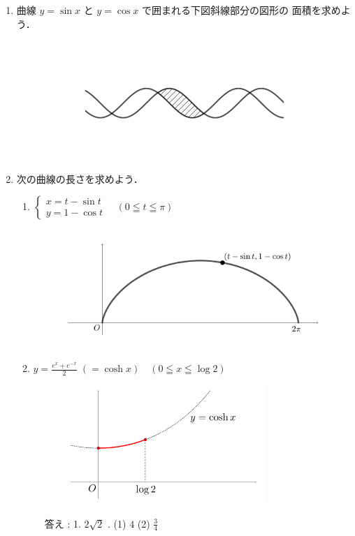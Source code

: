 \documentclass[10pt, uplatex, dvipdfmx]{jsarticle}
\theoremstyle{definition}
\numberwithin{equation}{section}
\newcommand{\ds}{\displaystyle}
\begin{document}
\begin{enumerate}

\item 曲線 $y=\sin x$ と $y=\cos x$ で囲まれる下図斜線部分の図形の
  面積を求めよう．
  \begin{figure}[h]
    \centering
    \includegraphics[height=4.5cm]{./pictures/05/sincos.pdf}
  \end{figure}
  
\item 次の曲線の長さを求めよう．
  \vspace{1zh}
  
  \begin{enumerate}[(1)]

    
  \item $\begin{cases}
      x=t-\sin t\\
      y=1-\cos t
    \end{cases}\quad (0 \leqq t \leqq \pi)$
    \begin{figure}[h]
      \centering
      \includegraphics[height=4.5cm]{./pictures/05/cycloid.pdf}
    \end{figure}
    
  \item $\ds y=\frac{e^{x}+e^{-x}}{2} \; \left(= \cosh x\right) \quad (0 \leqq x \leqq \log 2)$
    \begin{figure}[h]
      \centering
      \includegraphics[height=4.5cm]{./pictures/05/cosh.pdf}
    \end{figure}
  \end{enumerate}
  
  \begin{figure}[b]
  答え : 1. $2\sqrt{2}$ . (1) $4$ \quad (2) $\frac{3}{4}$
\end{figure}

\end{enumerate}
\end{document}
